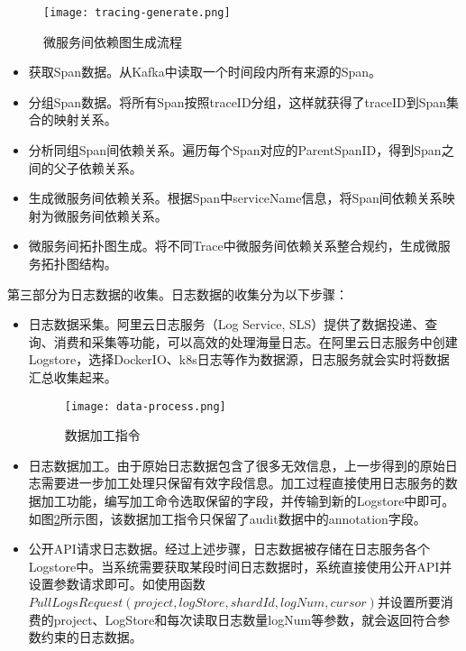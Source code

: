 \begin{figure}[htbp]
    \centering
    \texttt{[image: tracing-generate.png]}
    \caption{微服务间依赖图生成流程\label{tracing-generate}}
\end{figure}

\begin{itemize}
    \item [（1）]获取Span数据。从Kafka中读取一个时间段内所有来源的Span。
    \item [（2）]分组Span数据。将所有Span按照traceID分组，这样就获得了traceID到Span集合的映射关系。
    \item [（3）]分析同组Span间依赖关系。遍历每个Span对应的ParentSpanID，得到Span之间的父子依赖关系。
    \item [（4）]生成微服务间依赖关系。根据Span中serviceName信息，将Span间依赖关系映射为微服务间依赖关系。
    \item [（5）]微服务间拓扑图生成。将不同Trace中微服务间依赖关系整合规约，生成微服务拓扑图结构。
\end{itemize}

第三部分为日志数据的收集。日志数据的收集分为以下步骤：
\begin{itemize}
    \item [（1）]日志数据采集。阿里云日志服务（Log Service, SLS）提供了数据投递、查询、消费和采集等功能，可以高效的处理海量日志。在阿里云日志服务中创建Logstore，选择DockerIO、k8s日志等作为数据源，日志服务就会实时将数据汇总收集起来。
    \begin{figure}[htbp]
        \centering
        \texttt{[image: data-process.png]}
        \caption{数据加工指令\label{data-process}}
    \end{figure}
    \item [（2）]日志数据加工。由于原始日志数据包含了很多无效信息，上一步得到的原始日志需要进一步加工处理只保留有效字段信息。加工过程直接使用日志服务的数据加工功能，编写加工命令选取保留的字段，并传输到新的Logstore中即可。如图\ref{data-process}所示图，该数据加工指令只保留了audit数据中的annotation字段。
    \item [（3）]公开API请求日志数据。经过上述步骤，日志数据被存储在日志服务各个Logstore中。当系统需要获取某段时间日志数据时，系统直接使用公开API并设置参数请求即可。如使用函数$PullLogsRequest(project, logStore, shardId, logNum, cursor)$并设置所要消费的project、LogStore和每次读取日志数量logNum等参数，就会返回符合参数约束的日志数据。
\end{itemize}

